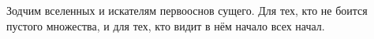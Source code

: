 \begin{dedication}
Зодчим вселенных и искателям первооснов сущего. Для тех, кто не боится пустого множества, и для тех, кто видит в нём начало всех начал.
\end{dedication}



